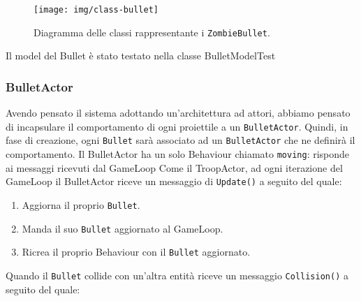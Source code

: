 \begin{figure}[H]
    \centering
    \texttt{[image: img/class-bullet]}
    \caption{Diagramma delle classi rappresentante i \texttt{ZombieBullet}.}
    \label{fig:class-bullet}
\end{figure}

Il model del Bullet è stato testato nella classe BulletModelTest

\subsubsection{BulletActor}
Avendo pensato il sistema adottando un'architettura ad attori, abbiamo pensato di incapsulare il comportamento
di ogni proiettile a un \texttt{BulletActor}. Quindi, in fase di creazione, ogni \texttt{Bullet} sarà associato ad un
\texttt{BulletActor} che ne definirà il comportamento.
Il BulletActor ha un solo Behaviour chiamato \texttt{moving}: risponde ai messaggi ricevuti dal GameLoop
Come il TroopActor, ad ogni iterazione del GameLoop il BulletActor riceve un messaggio di \texttt{Update()} a seguito del quale:
\begin{enumerate}
    \item Aggiorna il proprio \texttt{Bullet}.
    \item Manda il suo \texttt{Bullet} aggiornato al GameLoop.
    \item Ricrea il proprio Behaviour con il \texttt{Bullet} aggiornato.
\end{enumerate}
Quando il \texttt{Bullet} collide con un'altra entità riceve un messaggio \texttt{Collision()} a seguito del quale:
